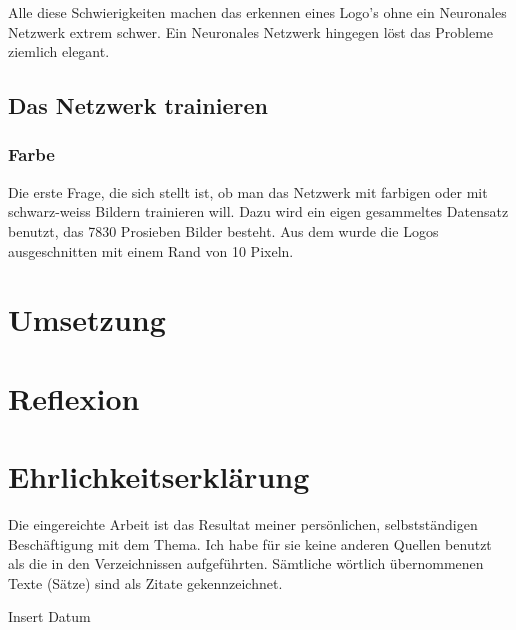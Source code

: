 \documentclass[12pt,a4paper]{report}
\begin{document}
Alle diese Schwierigkeiten machen das erkennen eines Logo's ohne ein Neuronales Netzwerk extrem schwer.
Ein Neuronales Netzwerk hingegen löst das Probleme ziemlich elegant.

\section{Das Netzwerk trainieren}
\subsection{Farbe}
Die erste Frage, die sich stellt ist, ob man das Netzwerk mit farbigen oder mit schwarz-weiss Bildern trainieren will.
Dazu wird ein eigen gesammeltes Datensatz benutzt, das 7830 Prosieben Bilder besteht.
Aus dem wurde die Logos ausgeschnitten mit einem Rand von 10 Pixeln.



\chapter{Umsetzung}
\label{ch:umsetzung}

\chapter{Reflexion}
\label{ch:reflexion}

\clearpage
{}
{}
\nocite{*}



\clearpage
{}
{}

\listoffigures

\appendix


\chapter*{Ehrlichkeitserklärung}

Die eingereichte Arbeit ist das Resultat meiner persönlichen, selbstständigen Beschäftigung mit dem Thema.
Ich habe für sie keine anderen Quellen benutzt als die in den Verzeichnissen aufgeführten.
Sämtliche wörtlich übernommenen Texte (Sätze) sind als Zitate gekennzeichnet.

\vspace{2cm}
Insert Datum
\end{document}
